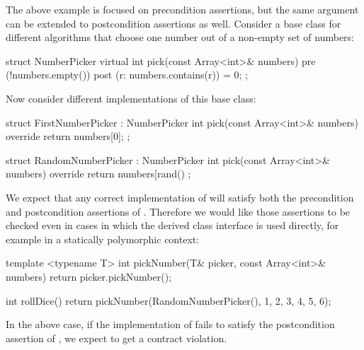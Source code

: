 The above example is focused on precondition assertions, but the same argument can be extended to postcondition assertions as well. Consider a base class for different algorithms that choose one number out of a non-empty set of numbers:
\begin{codeblock}
struct NumberPicker {
  virtual int pick(const Array<int>& numbers)
    pre (!numbers.empty())
    post (r: numbers.contains(r)) = 0;
};
\end{codeblock}
Now consider different implementations of this base class:
\begin{codeblock}
struct FirstNumberPicker : NumberPicker {
  int pick(const Array<int>& numbers) override {
    return numbers[0];
  }
};

struct RandomNumberPicker : NumberPicker {
  int pick(const Array<int>& numbers) override {
    return numbers[rand() %
  }
};
\end{codeblock}
We expect that any correct implementation of   will satisfy both the precondition and postcondition assertions of . Therefore we would like those assertions to be checked even in cases in which the derived class interface is used directly, for example in a statically polymorphic context:
\begin{codeblock}
template <typename T>
int pickNumber(T& picker, const Array<int>& numbers) {
  return picker.pickNumber();
}

int rollDice() {
  return pickNumber(RandomNumberPicker(), {1, 2, 3, 4, 5, 6});
}
\end{codeblock}
In the above case, if the implementation of  fails to satisfy the postcondition assertion of , we expect to get a contract violation.







